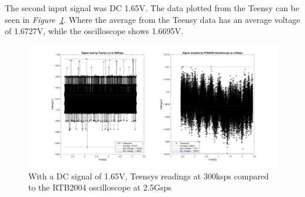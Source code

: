 The second input signal was DC 1.65V.
The data plotted from the Teensy can be seen in \textit{Figure~\ref{fig:OscilloCompTeensyDC}}.
Where the average from the Teensy data has an average voltage of 1.6727V, while the oscilloscope shows 1.6695V.


\begin{figure}[h]
    \centering
    \includegraphics[width=1.0\textwidth]{graphics/OscilloTeensyDC165Read.png}
    \caption{With a DC signal of 1.65V, Teensys readings at 300ksps compared to the RTB2004 oscilloscope at 2.5Gsps}
    \label{fig:OscilloCompTeensyDC}
\end{figure}




